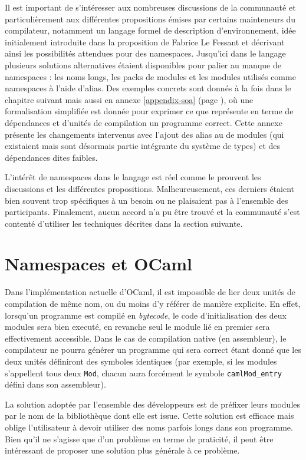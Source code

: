 \documentclass[11pt,a4paper]{report}
\begin{document}
Il est important de s'intéresser aux nombreuses discussions de la communauté
\cite{ocaml-platform} et particulièrement aux différentes propositions émises
par certains mainteneurs du compilateur\cite{ocaml-proposals}, notamment un
langage formel de description d'environnement\cite{remy-scherer-prop}, idée
initialement introduite dans la proposition de Fabrice Le
Fessant\cite{lefessant-prop} et décrivant ainsi les possibilités attendues pour
des namespaces. Jusqu'ici dans le langage plusieurs solutions alternatives
étaient disponibles pour palier au manque de namespaces : les noms longs, les
packs de modules et les modules utilisés comme namespaces à l'aide d'alias. Des
exemples concrets sont donnés à la fois dans le chapitre suivant mais aussi en
annexe \ref{appendix-soa} (page \pageref{appendix-soa}), où une formalisation
simplifiée est donnée pour exprimer ce que représente en terme de dépendances et
d'unités de compilation un programme correct. Cette annexe présente les
changements intervenus avec l'ajout des alias au de modules (qui existaient mais
sont désormais partie intégrante du système de types) et des dépendances dites
faibles.

L'intérêt de namespaces dans le langage est réel comme le prouvent les
discussions et les différentes propositions. Malheureusement, ces derniers
étaient bien souvent trop spécifiques à un besoin ou ne plaisaient pas à
l'ensemble des participants. Finalement, aucun accord n'a pu être trouvé et la
communauté s'est contenté d'utiliser les techniques décrites dans la section
suivante.

\section{Namespaces et OCaml}

Dans l'implémentation actuelle d'OCaml, il est impossible de lier deux unités de
compilation de même nom, ou du moins d'y référer de manière explicite. En effet,
lorsqu'un programme est compilé en \emph{bytecode}, le code d'initialisation des
deux modules sera bien executé, en revanche seul le module lié en premier sera
effectivement accessible. Dans le cas de compilation native (en assembleur), le
compilateur ne pourra générer un programme qui sera correct étant donné que les
deux unités définiront des symboles identiques (par exemple, si les modules
s'appellent tous deux \texttt{Mod}, chacun aura forcément le symbole
\texttt{camlMod_entry} défini dans son assembleur).

La solution adoptée par l'ensemble des développeurs est de préfixer leurs
modules par le nom de la bibliothèque dont elle est issue. Cette solution est
efficace mais oblige l'utilisateur à devoir utiliser des noms parfois longs dans
son programme. Bien qu'il ne s'agisse que d'un problème en terme de praticité,
il peut être intéressant de proposer une solution plus générale à ce problème.
\end{document}
